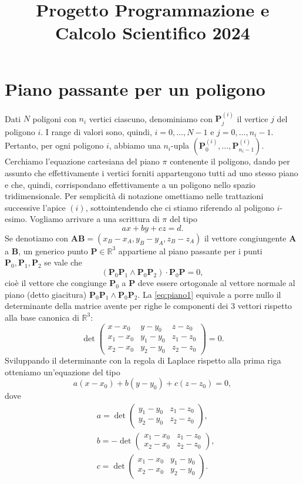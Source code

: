 \documentclass[a4paper]{article}
\title{Progetto Programmazione e Calcolo Scientifico 2024}
\newcommand{\B}{\mathbf}
\begin{document}
\maketitle

\section{Piano passante per un poligono}
Dati $N$ poligoni con $n_i$ vertici ciascuno, denominiamo con $\B{P}^{(i)}_j$ il vertice $j$ del poligono $i$. I range di valori sono, quindi, $i=0,\dots,N-1$ e $j=0,\dots,n_i-1$. Pertanto, per ogni poligono $i$, abbiamo una $n_i$-upla $(\B{P}^{(i)}_0,\dots,\B{P}^{(i)}_{n_i-1})$. Cerchiamo l'equazione cartesiana del piano $\pi$ contenente il poligono, dando per assunto che effettivamente i vertici forniti appartengono tutti ad uno stesso piano e che, quindi, corrispondano effettivamente a un poligono nello spazio tridimensionale. Per semplicità di notazione omettiamo nelle trattazioni successive l'apice $(i)$, sottointendendo che ci stiamo riferendo al poligono $i$-esimo. Vogliamo arrivare a una scrittura di $\pi$ del tipo $$ax+by+cz=d.$$
Se denotiamo con ${\B{A}\B{B}}=(x_B-x_A,y_B-y_A,z_B-z_A)$ il vettore congiungente $\B{A}$ a $\B{B}$, un generico punto $\B{P}\in\mathbb{R}^3$ appartiene al piano passante per i punti $\B{P}_0,\B{P}_1,\B{P}_2$ se vale che 
\begin{equation}\label{eq:piano1}
(\B{P}_0\B{P}_1\wedge \B{P}_0\B{P}_2)\cdot \B{P}_0\B{P}=0,
\end{equation} 
cioè il vettore che congiunge $\B{P}_0$ a $\B{P}$ deve essere ortogonale al vettore normale al piano (detto giacitura) $\B{P}_0\B{P}_1\wedge \B{P}_0\B{P}_2$. 
La \eqref{eq:piano1} equivale a porre nullo il determinante della matrice avente per righe le componenti dei $3$ vettori rispetto alla base canonica di $\mathbb{R}^3$: 
$$
\det\begin{pmatrix} x-x_0 & y-y_0 & z-z_0 \\ x_1-x_0 & y_1-y_0 & z_1-z_0 \\x_2-x_0 & y_2-y_0 & z_2-z_0 \end{pmatrix}=0.
$$
Sviluppando il determinante con la regola di Laplace rispetto alla prima riga otteniamo un'equazione del tipo 
\begin{equation}\label{eq:piano2}
a\left(x-x_0\right)+b\left(y-y_0\right)+c\left(z-z_0\right)=0,
\end{equation} 
dove 
\[
\begin{aligned}
& a=\operatorname{det}\left(\begin{array}{ll} y_1-y_0 & z_1-z_0 \\ y_2-y_0 & z_2-z_0 \end{array}\right), \\
& b=-\operatorname{det}\left(\begin{array}{ll}x_1-x_0& z_1-z_0 \\ x_2-x_0 & z_2-z_0 \end{array}\right),\\
& c=\operatorname{det}\left(\begin{array}{ll} x_1-x_0 & y_1-y_0 \\ x_2-x_0 & y_2-y_0 \end{array}\right). 
\end{aligned}
\]
\end{document}
